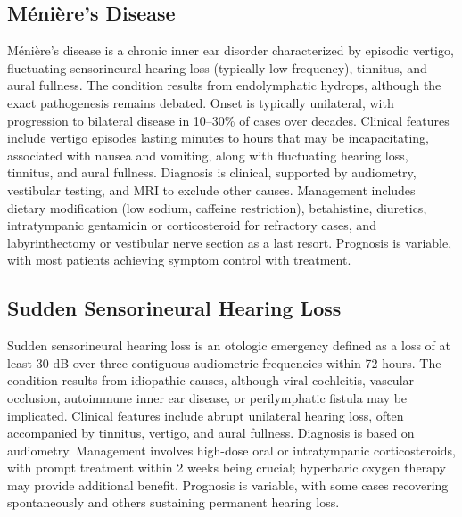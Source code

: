 \subsection{Ménière's Disease}
\label{sec:Ménière's Disease}
Ménière's disease is a chronic inner ear disorder characterized by episodic vertigo, fluctuating sensorineural hearing loss (typically low-frequency), tinnitus, and aural fullness. The condition results from endolymphatic hydrops, although the exact pathogenesis remains debated. Onset is typically unilateral, with progression to bilateral disease in 10--30\% of cases over decades. Clinical features include vertigo episodes lasting minutes to hours that may be incapacitating, associated with nausea and vomiting, along with fluctuating hearing loss, tinnitus, and aural fullness. Diagnosis is clinical, supported by audiometry, vestibular testing, and MRI to exclude other causes. Management includes dietary modification (low sodium, caffeine restriction), betahistine, diuretics, intratympanic gentamicin or corticosteroid for refractory cases, and labyrinthectomy or vestibular nerve section as a last resort. Prognosis is variable, with most patients achieving symptom control with treatment.

\subsection{Sudden Sensorineural Hearing Loss}
\label{sec:Sudden Sensorineural Hearing Loss}
Sudden sensorineural hearing loss is an otologic emergency defined as a loss of at least 30 dB over three contiguous audiometric frequencies within 72 hours. The condition results from idiopathic causes, although viral cochleitis, vascular occlusion, autoimmune inner ear disease, or perilymphatic fistula may be implicated. Clinical features include abrupt unilateral hearing loss, often accompanied by tinnitus, vertigo, and aural fullness. Diagnosis is based on audiometry. Management involves high-dose oral or intratympanic corticosteroids, with prompt treatment within 2 weeks being crucial; hyperbaric oxygen therapy may provide additional benefit. Prognosis is variable, with some cases recovering spontaneously and others sustaining permanent hearing loss.

